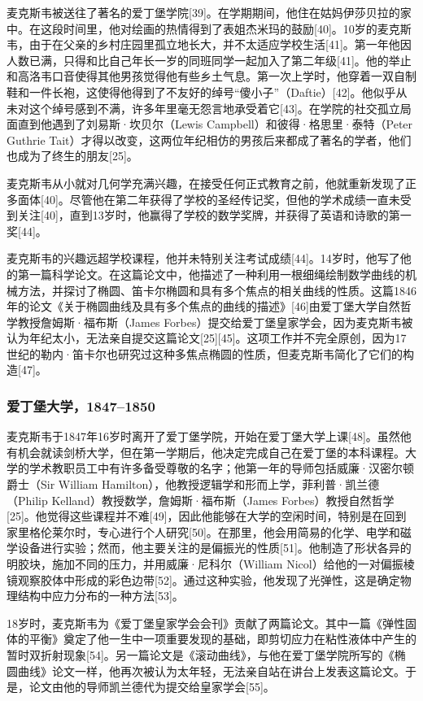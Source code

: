 麦克斯韦被送往了著名的爱丁堡学院[39]。在学期期间，他住在姑妈伊莎贝拉的家中。在这段时间里，他对绘画的热情得到了表姐杰米玛的鼓励[40]。10岁的麦克斯韦，由于在父亲的乡村庄园里孤立地长大，并不太适应学校生活[41]。第一年他因人数已满，只得和比自己年长一岁的同班同学一起加入了第二年级[41]。他的举止和高洛韦口音使得其他男孩觉得他有些乡土气息。第一次上学时，他穿着一双自制鞋和一件长袍，这使得他得到了不友好的绰号“傻小子”（Daftie）[42]。他似乎从未对这个绰号感到不满，许多年里毫无怨言地承受着它[43]。在学院的社交孤立局面直到他遇到了刘易斯·坎贝尔（Lewis Campbell）和彼得·格思里·泰特（Peter Guthrie Tait）才得以改变，这两位年纪相仿的男孩后来都成了著名的学者，他们也成为了终生的朋友[25]。

麦克斯韦从小就对几何学充满兴趣，在接受任何正式教育之前，他就重新发现了正多面体[40]。尽管他在第二年获得了学校的圣经传记奖，但他的学术成绩一直未受到关注[40]，直到13岁时，他赢得了学校的数学奖牌，并获得了英语和诗歌的第一奖[44]。

麦克斯韦的兴趣远超学校课程，他并未特别关注考试成绩[44]。14岁时，他写了他的第一篇科学论文。在这篇论文中，他描述了一种利用一根细绳绘制数学曲线的机械方法，并探讨了椭圆、笛卡尔椭圆和具有多个焦点的相关曲线的性质。这篇1846年的论文《关于椭圆曲线及具有多个焦点的曲线的描述》[46]由爱丁堡大学自然哲学教授詹姆斯·福布斯（James Forbes）提交给爱丁堡皇家学会，因为麦克斯韦被认为年纪太小，无法亲自提交这篇论文[25][45]。这项工作并不完全原创，因为17世纪的勒内·笛卡尔也研究过这种多焦点椭圆的性质，但麦克斯韦简化了它们的构造[47]。
\subsubsection{爱丁堡大学，1847–1850}
麦克斯韦于1847年16岁时离开了爱丁堡学院，开始在爱丁堡大学上课[48]。虽然他有机会就读剑桥大学，但在第一学期后，他决定完成自己在爱丁堡的本科课程。大学的学术教职员工中有许多备受尊敬的名字；他第一年的导师包括威廉·汉密尔顿爵士（Sir William Hamilton），他教授逻辑学和形而上学，菲利普·凯兰德（Philip Kelland）教授数学，詹姆斯·福布斯（James Forbes）教授自然哲学[25]。他觉得这些课程并不难[49]，因此他能够在大学的空闲时间，特别是在回到家里格伦莱尔时，专心进行个人研究[50]。在那里，他会用简易的化学、电学和磁学设备进行实验；然而，他主要关注的是偏振光的性质[51]。他制造了形状各异的明胶块，施加不同的压力，并用威廉·尼科尔（William Nicol）给他的一对偏振棱镜观察胶体中形成的彩色边带[52]。通过这种实验，他发现了光弹性，这是确定物理结构中应力分布的一种方法[53]。

18岁时，麦克斯韦为《爱丁堡皇家学会会刊》贡献了两篇论文。其中一篇《弹性固体的平衡》奠定了他一生中一项重要发现的基础，即剪切应力在粘性液体中产生的暂时双折射现象[54]。另一篇论文是《滚动曲线》，与他在爱丁堡学院所写的《椭圆曲线》论文一样，他再次被认为太年轻，无法亲自站在讲台上发表这篇论文。于是，论文由他的导师凯兰德代为提交给皇家学会[55]。

